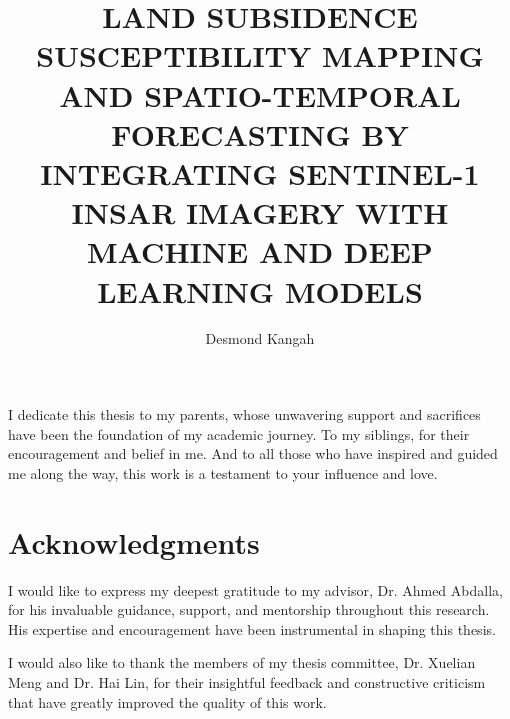 \documentclass[oneside,doublespacing,flushright]{lsuthesis}
\title{LAND SUBSIDENCE SUSCEPTIBILITY MAPPING AND SPATIO-TEMPORAL FORECASTING BY INTEGRATING SENTINEL-1 INSAR IMAGERY WITH MACHINE AND DEEP LEARNING MODELS}
\author{Desmond Kangah}
\begin{document}
\frontmatter

\maketitle

\begin{centeredpage}
I dedicate this thesis to my parents, whose unwavering support and sacrifices have been the foundation of
my academic journey. To my siblings, for their encouragement and belief in me. And to all those who have 
inspired and guided me along the way, this work is a testament to your influence and love.
\end{centeredpage}

\chapter{Acknowledgments}
I would like to express my deepest gratitude to my advisor, Dr. Ahmed Abdalla, for his invaluable guidance, support, and mentorship throughout this research.
His expertise and encouragement have been instrumental in shaping this thesis.

I would also like to thank the members of my thesis committee, Dr. Xuelian Meng and Dr. Hai Lin, for their insightful feedback and constructive criticism that have greatly improved the quality of this work.
\clearpage
{}
\tableofcontents

\clearpage
{}
\listoftables

\clearpage
{}
\listoffigures
\newpage


\end{document}
